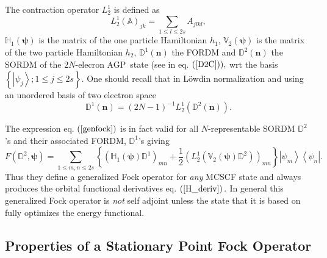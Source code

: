 \documentclass[aps,preprint]{revtex4}%
\begin{document}
The contraction operator $L_{2}^{1}$ is defined as
\begin{equation}
L_{2}^{1}\left(  \mathbb{A}\right)  _{jk}=\sum_{1\leq l\leq2s}A_{jlkl},
\end{equation}
$\mathbb{H}_{1}\left(  \mathbf{\psi}\right)  $ is the matrix of the one
particle Hamiltonian $h_{1}$, $\mathbb{V}_{2}\left(  \mathbf{\psi}\right)  $
is the matrix of the two particle Hamiltonian $h_{2}$, $\mathbb{D}^{1}\left(
\mathbf{n}\right)  $ the FORDM and $\mathbb{D}^{2}\left(  \mathbf{n}\right)  $
the SORDM of the $2N$-elecron AGP\ state (see in eq. $\left(  \ref{D2C}%
\right)  ),$ wrt the basis $\left\{  \left\vert \psi_{j}\right\rangle ;1\leq
j\leq2s\right\}  .$ One should recall that in L\"{o}wdin normalization and
using an unordered basis of two electron space
\begin{equation}
\mathbb{D}^{1}\left(  \mathbf{n}\right)  =\left(  2N-1\right)  ^{-1}L_{2}%
^{1}\left(  \mathbb{D}^{2}\left(  \mathbf{n}\right)  \right)  .
\end{equation}


The expression eq. $\left(  \ref{genfock}\right)  $ is in fact valid for all
$N$-representable SORDM $\mathbb{D}^{2}$'s and their associated FORDM,
$\mathbb{D}^{1}$'s giving
\begin{equation}
F\left(  \mathbb{D}^{2}\mathbf{,\psi}\right)  =\sum_{1\leq m,n\leq2s}\left\{
\left(  \mathbb{H}_{1}\left(  \mathbf{\psi}\right)  \mathbb{D}^{1}\right)
_{mn}+\frac{1}{2}\left(  L_{2}^{1}\left(  \mathbb{V}_{2}\left(  \mathbf{\psi
}\right)  \mathbb{D}^{2}\right)  \right)  _{mn}\right\}  \left\vert \psi
_{m}\right\rangle \left\langle \psi_{n}\right\vert .
\end{equation}
Thus they define a generalized Fock operator for \emph{any }MCSCF state and
always produces the orbital functional derivatives eq. $\left(  \ref{H_deriv}%
\right)  .$ In general this generalized Fock operator is \emph{not }self
adjoint\emph{ }unless the state that it is based on fully optimizes the energy functional.

\subsection{Properties of a Stationary Point Fock Operator\label{Stat_Fock}}
\end{document}
